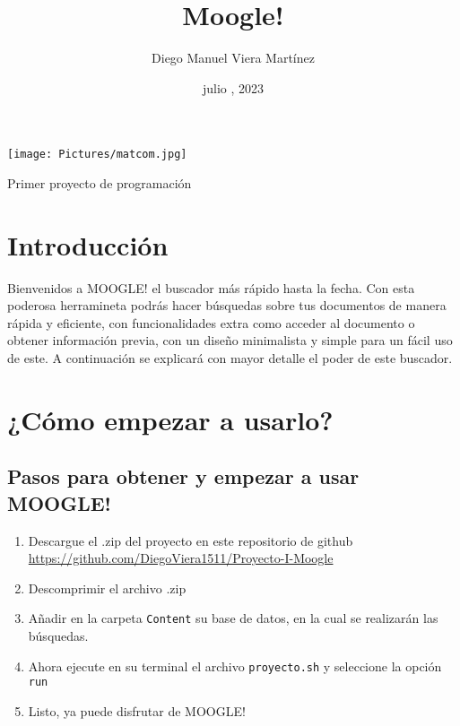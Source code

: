 \documentclass[a4paper,12pt]{article}
\begin{document}
\title{\Huge \textbf{Moogle!}}
\author{Diego Manuel Viera Martínez}
\date{julio , 2023}
\maketitle
\begin{center}
    \texttt{[image: Pictures/matcom.jpg]}\label{fig:logo}
\end{center}

\begin{center}
   \Huge Primer proyecto de programación
\end{center}

\newpage
\section{Introducción}\label{sec:intro}

Bienvenidos a MOOGLE! el buscador más rápido hasta la fecha. Con esta poderosa herramineta podrás hacer búsquedas sobre tus documentos
de manera rápida y eficiente, con funcionalidades extra como acceder al documento o obtener información previa, con un diseño minimalista y simple 
para un fácil uso de este. A continuación se explicará con mayor detalle el poder de este buscador.

\section{¿Cómo empezar a usarlo?}\label{sec:start}

\subsection{Pasos para obtener y empezar a usar MOOGLE!}

\begin{enumerate}
    \item Descargue el .zip del proyecto en este repositorio de github \url{https://github.com/DiegoViera1511/Proyecto-I-Moogle}
    \item Descomprimir el archivo .zip
    \item Añadir en la carpeta \texttt{Content} su base de datos, en la cual se realizarán las búsquedas.
    \item Ahora ejecute en su terminal el archivo \texttt{proyecto.sh} y seleccione la opción \texttt{run}
    \item  Listo, ya puede disfrutar de MOOGLE!
\end{enumerate}
 
\end{document}
